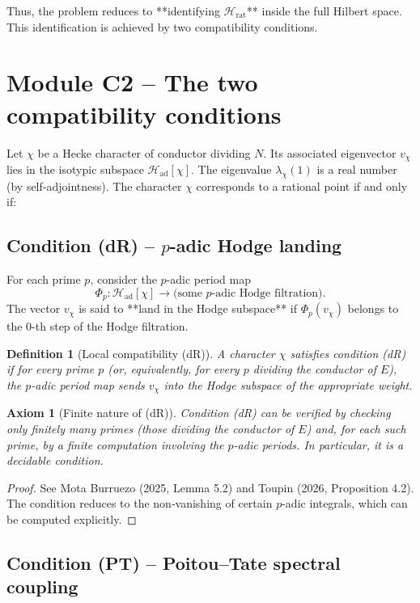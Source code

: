 \documentclass[11pt,a4paper]{article}
\newtheorem{definition}[theorem]{Definition}
\newtheorem{axiom}{Axiom}[section]
\begin{document}
Thus, the problem reduces to **identifying $\mathcal{H}_{\text{rat}}$** inside the full Hilbert space. This identification is achieved by two compatibility conditions.

\section{Module C2 – The two compatibility conditions}

Let $\chi$ be a Hecke character of conductor dividing $N$. Its associated eigenvector $v_\chi$ lies in the isotypic subspace $\mathcal{H}_{\text{ad}}[\chi]$. The eigenvalue $\lambda_\chi(1)$ is a real number (by self‑adjointness). The character $\chi$ corresponds to a rational point if and only if:

\subsection{Condition (dR) – $p$-adic Hodge landing}

For each prime $p$, consider the $p$-adic period map
\[
\Phi_p : \mathcal{H}_{\text{ad}}[\chi] \to \text{(some $p$-adic Hodge filtration)}.
\]
The vector $v_\chi$ is said to **land in the Hodge subspace** if $\Phi_p(v_\chi)$ belongs to the $0$-th step of the Hodge filtration.

\begin{definition}[Local compatibility (dR)]
A character $\chi$ satisfies condition (dR) if for every prime $p$ (or, equivalently, for every $p$ dividing the conductor of $E$), the $p$-adic period map sends $v_\chi$ into the Hodge subspace of the appropriate weight.
\end{definition}

\begin{axiom}[Finite nature of (dR)]
Condition (dR) can be verified by checking only finitely many primes (those dividing the conductor of $E$) and, for each such prime, by a finite computation involving the $p$-adic periods. In particular, it is a decidable condition.
\end{axiom}
\begin{proof}
See Mota Burruezo (2025, Lemma 5.2) and Toupin (2026, Proposition 4.2). The condition reduces to the non‑vanishing of certain $p$-adic integrals, which can be computed explicitly.
\end{proof}

\subsection{Condition (PT) – Poitou–Tate spectral coupling}
\end{document}
